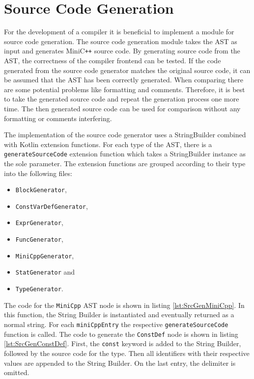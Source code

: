 \section{Source Code Generation}

For the development of a compiler it is beneficial to implement a module for source code generation. The source code generation module takes the AST as input and generates MiniC\verb|++| source code. By generating source code from the AST, the correctness of the compiler frontend can be tested. If the code generated from the source code generator matches the original source code, it can be assumed that the AST has been correctly generated. When comparing there are some potential problems like formatting and comments. Therefore, it is best to take the generated source code and repeat the generation process one more time. The then generated source code can be used for comparison without any formatting or comments interfering. 

The implementation of the source code generator uses a StringBuilder combined with Kotlin extension functions. For each type of the AST, there is a \verb|generateSourceCode| extension function which takes a StringBuilder instance as the sole parameter. The extension functions are grouped according to their type into the following files:

\begin{itemize}
    \item \verb|BlockGenerator|,
    \item \verb|ConstVarDefGenerator|,
    \item \verb|ExprGenerator|,
    \item \verb|FuncGenerator|,
    \item \verb|MiniCppGenerator|,
    \item \verb|StatGenerator| and
    \item \verb|TypeGenerator|.
\end{itemize}

The code for the \verb|MiniCpp| AST node is shown in listing \ref{lst:SrcGenMiniCpp}. In this function, the String Builder is instantiated and eventually returned as a normal string. For each \verb|miniCppEntry| the respective \verb|generateSourceCode| function is called. The code to generate the \verb|ConstDef| node is shown in listing \ref{lst:SrcGenConstDef}. First, the \verb|const| keyword is added to the String Builder, followed by the source code for the type. Then all identifiers with their respective values are appended to the String Builder. On the last entry, the delimiter is omitted. 


